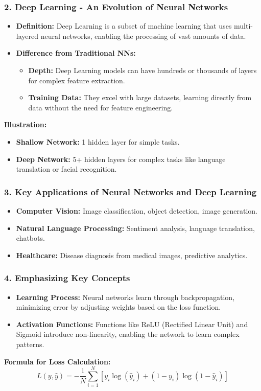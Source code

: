 \documentclass[aspectratio=169]{beamer}
\begin{document}
\begin{frame}[fragile]
    \frametitle{2. Deep Learning - An Evolution of Neural Networks}
    \begin{itemize}
        \item \textbf{Definition:} Deep Learning is a subset of machine learning that uses multi-layered neural networks, enabling the processing of vast amounts of data.
        \item \textbf{Difference from Traditional NNs:}
        \begin{itemize}
            \item \textbf{Depth:} Deep Learning models can have hundreds or thousands of layers for complex feature extraction.
            \item \textbf{Training Data:} They excel with large datasets, learning directly from data without the need for feature engineering.
        \end{itemize}
    \end{itemize}
    \textbf{Illustration:}
    \begin{itemize}
        \item \textbf{Shallow Network:} 1 hidden layer for simple tasks.
        \item \textbf{Deep Network:} 5+ hidden layers for complex tasks like language translation or facial recognition.
    \end{itemize}
\end{frame}

\begin{frame}[fragile]
    \frametitle{3. Key Applications of Neural Networks and Deep Learning}
    \begin{itemize}
        \item \textbf{Computer Vision:} Image classification, object detection, image generation.
        \item \textbf{Natural Language Processing:} Sentiment analysis, language translation, chatbots.
        \item \textbf{Healthcare:} Disease diagnosis from medical images, predictive analytics.
    \end{itemize}
\end{frame}

\begin{frame}[fragile]
    \frametitle{4. Emphasizing Key Concepts}
    \begin{itemize}
        \item \textbf{Learning Process:} Neural networks learn through backpropagation, minimizing error by adjusting weights based on the loss function.
        \item \textbf{Activation Functions:} Functions like ReLU (Rectified Linear Unit) and Sigmoid introduce non-linearity, enabling the network to learn complex patterns.
    \end{itemize}
    \textbf{Formula for Loss Calculation:}
    \begin{equation}
        L(y, \hat{y}) = -\frac{1}{N} \sum_{i=1}^{N} [y_i \log(\hat{y}_i) + (1 - y_i) \log(1 - \hat{y}_i)]
    \end{equation}
\end{frame}
\end{document}

